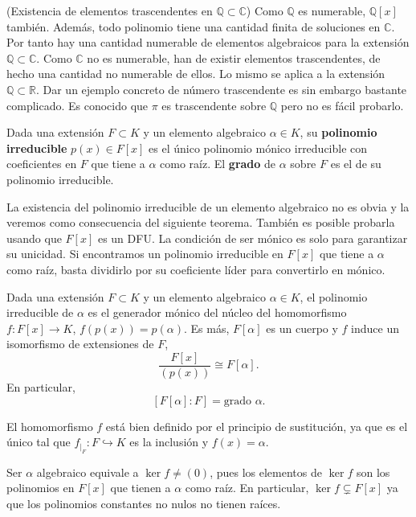 \textrm{\normalfont (Existencia de elementos trascendentes en $\mathbb Q\subset\mathbb C$)}
Como \(\mathbb Q\) es numerable, \(\mathbb Q[x]\) también. Además, todo
polinomio tiene una cantidad finita de soluciones en \(\mathbb C\). Por
tanto hay una cantidad numerable de elementos algebraicos para la
extensión \(\mathbb Q\subset\mathbb C\). Como \(\mathbb C\) no es
numerable, han de existir elementos trascendentes, de hecho una cantidad
no numerable de ellos. Lo mismo se aplica a la extensión
\(\mathbb Q\subset\mathbb R\). Dar un ejemplo concreto de número
trascendente es sin embargo bastante complicado. Es conocido que \(\pi\)
es trascendente sobre \(\mathbb Q\) pero no es fácil probarlo.


Dada una extensión \(F\subset K\) y un elemento algebraico
\(\alpha\in K\), su \textbf{polinomio irreducible} \(p(x)\in F[x]\) es
el único polinomio mónico irreducible con coeficientes en \(F\) que
tiene a \(\alpha\) como raíz. El \textbf{grado} de \(\alpha\) sobre
\(F\) es el de su polinomio irreducible. 


La existencia del polinomio irreducible de un elemento algebraico no es
obvia y la veremos como consecuencia del siguiente teorema. También es
posible probarla usando que \(F[x]\) es un DFU. La condición de ser
mónico es solo para garantizar su unicidad. Si encontramos un polinomio
irreducible en \(F[x]\) que tiene a \(\alpha\) como raíz, basta
dividirlo por su coeficiente líder para convertirlo en mónico.


Dada una extensión \(F\subset K\) y un elemento algebraico
\(\alpha\in K\), el polinomio irreducible de \(\alpha\) es el generador
mónico del núcleo del homomorfismo \(f\colon F[x]\rightarrow K\),
\(f(p(x))=p(\alpha)\). Es más, \(F[\alpha]\) es un cuerpo y \(f\) induce
un isomorfismo de extensiones de \(F\),
\[\frac{F[x]}{(p(x))}\cong F[\alpha].\] En particular,
\[[F[\alpha]:F]=\text{grado }\alpha.\] 


El homomorfismo \(f\) está bien definido por el principio de
sustitución, ya que es el único tal que
\(f_{|_F}\colon F\hookrightarrow K\) es la inclusión y \(f(x)=\alpha\).

Ser \(\alpha\) algebraico equivale a \(\ker f\neq (0)\), pues los
elementos de \(\ker f\) son los polinomios en \(F[x]\) que tienen a
\(\alpha\) como raíz. En particular, \(\ker f\subsetneq F[x]\) ya que
los polinomios constantes no nulos no tienen raíces.

